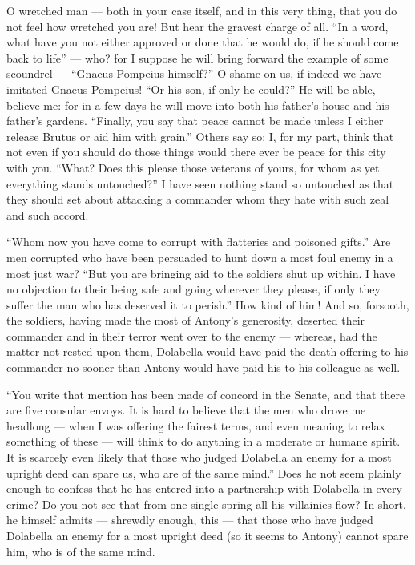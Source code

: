  O wretched man --- both in your case itself, and in this very thing, that you do not feel how wretched you are! But hear the gravest charge of all. ``In a word, what have you not either approved or done that he would do, if he should come back to life'' --- who? for I suppose he will bring forward the example of some scoundrel --- ``Gnaeus Pompeius himself?'' O shame on us, if indeed we have imitated Gnaeus Pompeius! ``Or his son, if only he could?'' He will be able, believe me: for in a few days he will move into both his father's house and his father's gardens. ``Finally, you say that peace cannot be made unless I either release Brutus or aid him with grain.'' Others say so: I, for my part, think that not even if you should do those things would there ever be peace for this city with you. ``What? Does this please those veterans of yours, for whom as yet everything stands untouched?'' I have seen nothing stand so untouched as that they should set about attacking a commander whom they hate with such zeal and such accord.

 ``Whom now you have come to corrupt with flatteries and poisoned gifts.'' Are men corrupted who have been persuaded to hunt down a most foul enemy in a most just war? ``But you are bringing aid to the soldiers shut up within. I have no objection to their being safe and going wherever they please, if only they suffer the man who has deserved it to perish.'' How kind of him! And so, forsooth, the soldiers, having made the most of Antony's generosity, deserted their commander and in their terror went over to the enemy --- whereas, had the matter not rested upon them, Dolabella would have paid the death-offering to his commander no sooner than Antony would have paid his to his colleague as well.

 ``You write that mention has been made of concord in the Senate, and that there are five consular envoys. It is hard to believe that the men who drove me headlong --- when I was offering the fairest terms, and even meaning to relax something of these --- will think to do anything in a moderate or humane spirit. It is scarcely even likely that those who judged Dolabella an enemy for a most upright deed can spare us, who are of the same mind.'' Does he not seem plainly enough to confess that he has entered into a partnership with Dolabella in every crime? Do you not see that from one single spring all his villainies flow? In short, he himself admits --- shrewdly enough, this --- that those who have judged Dolabella an enemy for a most upright deed (so it seems to Antony) cannot spare him, who is of the same mind.

